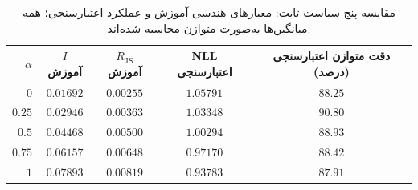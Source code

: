 \begin{table}[htbp]
\centering\small
\caption{مقایسه پنج سیاست ثابت: معیارهای هندسی آموزش و عملکرد اعتبارسنجی؛ همه میانگین‌ها به‌صورت متوازن محاسبه شده‌اند.}
\label{tab:ch4-five-fixed-policies}
\begin{tabular}{rcccc}\hline
$\alpha$ & $I$ آموزش & $R_{\mathrm{JS}}$ آموزش & NLL اعتبارسنجی & دقت متوازن اعتبارسنجی (درصد)\\\hline
$0$ & $0.01692$ & $0.00255$ & $1.05791$ & $88.25$\\
$0.25$ & $0.02946$ & $0.00363$ & $1.03348$ & $90.80$\\
$0.5$ & $0.04468$ & $0.00500$ & $1.00294$ & $88.93$\\
$0.75$ & $0.06157$ & $0.00648$ & $0.97170$ & $88.42$\\
$1$ & $0.07893$ & $0.00819$ & $0.93783$ & $87.91$\\\hline
\end{tabular}
\end{table}
